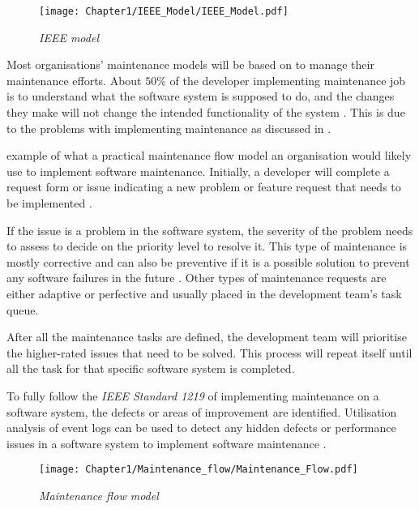 \begin{figure}[!htb] %
	\centering %
	\texttt{[image: Chapter1/IEEE\_Model/IEEE\_Model.pdf]}
	\caption[IEEE model]
	{\textit{IEEE model \cite{Ren2011}}} \label{fig:ch1_ieeeModel}
\end{figure}

Most organisations' maintenance models will be based on  to manage their maintenance efforts. About $50\%$ of the developer implementing maintenance job is to understand what the software system is supposed to do, and the changes they make will not change the intended functionality of the system \cite{Tang2010, Zhuo1993}. This is due to the problems with implementing maintenance as discussed in .\par {} example of what a practical maintenance flow model an organisation would likely use to implement software maintenance. Initially, a developer will complete a request form or issue indicating a new problem or feature request that needs to be implemented \cite{Tang2010}.\par If the issue is a problem in the software system, the severity of the problem needs to assess to decide on the priority level to resolve it. This type of maintenance is mostly corrective and can also be preventive if it is a possible solution to prevent any software failures in the future \cite{Tang2010}. Other types of maintenance requests are either adaptive or perfective and usually placed in the development team's task queue.\par After all the maintenance tasks are defined, the development team will prioritise the higher-rated issues that need to be solved. This process will repeat itself until all the task for that specific software system is completed.\par To fully follow the \textit{IEEE Standard 1219} of implementing maintenance on a software system, the defects or areas of improvement are identified. Utilisation analysis of event logs can be used to detect any hidden defects or performance issues in a software system to implement software maintenance \cite{Cinque2013, Rong2018a, Levin2019}.

\begin{figure}[!htb] %
	\centering %
	\texttt{[image: Chapter1/Maintenance\_flow/Maintenance\_Flow.pdf]}
	\caption[Maintenance flow model]
	{\textit{Maintenance flow model \cite{Tang2010}}} \label{fig:ch1_maintenanceFlow}
\end{figure}
